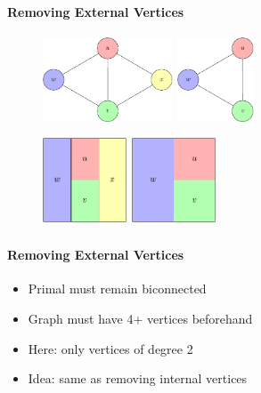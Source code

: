\documentclass[t,18pt]{beamer}
\begin{document}
\begin{frame}[c]
  \frametitle{}
  \framesubtitle{Removing External Vertices}
  \begin{figure}
    \includegraphics[height=2.5cm]{../Thesis/Resources/RemoveVertex-Example-External-1.pdf}
    \qquad
    \includegraphics[height=2.5cm]{../Thesis/Resources/RemoveVertex-Example-External-2.pdf}
    \qquad\qquad
  \end{figure}
  \begin{figure}
    \includegraphics[height=2.5cm]{../Thesis/Resources/RemoveVertex-Example-External-3.pdf}
    \qquad\qquad
    \includegraphics[height=2.5cm]{../Thesis/Resources/RemoveVertex-Example-External-4.pdf}
  \end{figure}
\end{frame}

\begin{frame}
  \frametitle{}
  \framesubtitle{Removing External Vertices}
  \begin{itemize}
    \item Primal must remain biconnected
    \item Graph must have 4+ vertices beforehand
    \item Here: only vertices of degree 2
    \vspace{1cm}
    \item<2-> Idea: same as removing internal vertices
  \end{itemize}
\end{frame}
\end{document}
